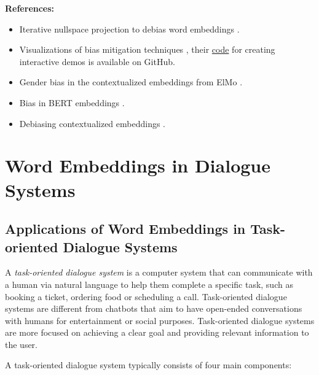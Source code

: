 \documentclass[11pt, a4paper]{amsart}
\begin{document}
\noindent \textbf{References:}
\begin{itemize}
	\item Iterative nullspace projection to debias word embeddings \cite{ravfogel-etal-2020-null}.
	\item Visualizations of bias mitigation techniques \cite{DBLP:journals/corr/abs-2104-02797},
	their \href{https://github.com/tdavislab/verb}{code} for creating interactive demos is available on GitHub.
	\item Gender bias in the contextualized embeddings from ElMo \cite{zhao-etal-2019-gender}.
	\item Bias in BERT embeddings \cite{kurita-etal-2019-measuring}.
	\item Debiasing contextualized embeddings \cite{kaneko-bollegala-2021-debiasing}.
\end{itemize}

\section{Word Embeddings in Dialogue Systems}


\subsection{Applications of Word Embeddings in Task-oriented Dialogue Systems}

A \emph{task-oriented dialogue system} is a computer system that can communicate with a human via natural language to help them complete a specific task, such as booking a ticket, ordering food or scheduling a call.
Task-oriented dialogue systems are different from chatbots that aim to have open-ended conversations with humans for entertainment or social purposes.
Task-oriented dialogue systems are more focused on achieving a clear goal and providing relevant information to the user.

A task-oriented dialogue system typically consists of four main components:
\end{document}
